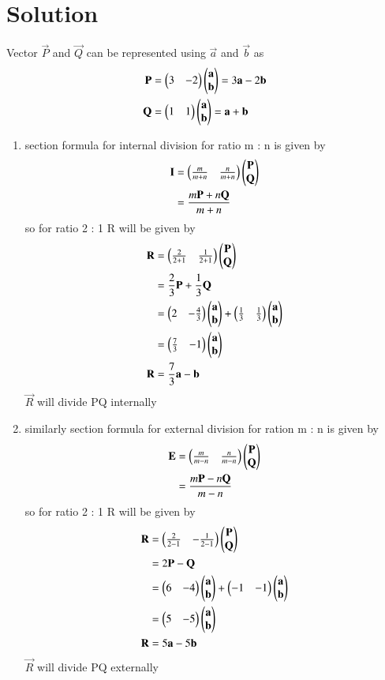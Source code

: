 \documentclass[journal,12pt,twocolumn]{IEEEtran}
\begin{document}
\section{Solution}
Vector $\vec{P}$ and $\vec{Q}$ can be represented using $\vec{a}$ and $\vec{b}$ as
\begin{align}
\mathbf{P} &= \begin{pmatrix}3&-2\end{pmatrix}\begin{pmatrix}\mathbf{a}\\\mathbf{b}\end{pmatrix} = 3\mathbf{a} - 2\mathbf{b}\\
\mathbf{Q} &= \begin{pmatrix}1&1\end{pmatrix}\begin{pmatrix}\mathbf{a}\\\mathbf{b}\end{pmatrix} = \mathbf{a} +\mathbf{b}
\end{align}
\begin{enumerate}
\item 
section formula for internal division for ratio m : n is given by 
\begin{align}
\mathbf{I} &= \begin{pmatrix}\frac{m}{m+n} & \frac{n}{m+n}\end{pmatrix}\begin{pmatrix}\mathbf{P}\\\mathbf{Q}\end{pmatrix}\\
&=  \frac{m\mathbf{P} + n\mathbf{Q}}{m + n}
\end{align}
so for ratio 2 : 1 R will be given by
\begin{align}
\mathbf{R} &= \begin{pmatrix}\frac{2}{2+1} & \frac{1}{2+1}\end{pmatrix}\begin{pmatrix}\mathbf{P}\\\mathbf{Q}\end{pmatrix}\\
&= \frac{2}{3}\mathbf{P} + \frac{1}{3}\mathbf{Q}\\
&= \begin{pmatrix}2 & -\frac{4}{3}\end{pmatrix}\begin{pmatrix}\mathbf{a}\\\mathbf{b}\end{pmatrix} + 
\begin{pmatrix}\frac{1}{3} & \frac{1}{3}\end{pmatrix}\begin{pmatrix}\mathbf{a}\\\mathbf{b}\end{pmatrix}\\
&= \begin{pmatrix}\frac{7}{3}&-1\end{pmatrix}\begin{pmatrix}\mathbf{a}\\\mathbf{b}\end{pmatrix}\\
\mathbf{R} &= \frac{7}{3}\mathbf{a} - \mathbf{b}
\end{align}
$\vec{R}$ will divide PQ internally\\
\item similarly section formula for external division for ration m : n is given by
\begin{align}
\mathbf{E} &= \begin{pmatrix}\frac{m}{m-n} & \frac{n}{m-n}\end{pmatrix}\begin{pmatrix}\mathbf{P}\\\mathbf{Q}\end{pmatrix}\\
&= \frac{m\mathbf{P} - n\mathbf{Q}}{m - n}
\end{align}
so for ratio 2 : 1 R will be given by
\begin{align}
\mathbf{R} &= \begin{pmatrix}\frac{2}{2-1} & -\frac{1}{2-1}\end{pmatrix}\begin{pmatrix}\mathbf{P}\\\mathbf{Q}\end{pmatrix}\\
&= 2\mathbf{P} - \mathbf{Q}\\
&= \begin{pmatrix}6 & -4\end{pmatrix}\begin{pmatrix}\mathbf{a}\\\mathbf{b}\end{pmatrix} + 
\begin{pmatrix}-1 & -1\end{pmatrix}\begin{pmatrix}\mathbf{a}\\\mathbf{b}\end{pmatrix}\\
&= \begin{pmatrix}5&-5\end{pmatrix}\begin{pmatrix}\mathbf{a}\\\mathbf{b}\end{pmatrix}\\
\mathbf{R} &= 5\mathbf{a} - 5\mathbf{b}
\end{align}
$\vec{R}$ will divide PQ externally
\end{enumerate}
\end{document}
